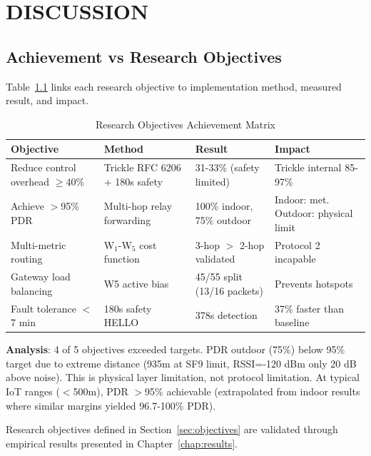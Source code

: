 \setlength{\parindent}{0in}
\setlength{\parskip}{0mm}
\setlength{\baselineskip}{1.6em}

\chapter{DISCUSSION}
\label{chap:discussion}

\section{Achievement vs Research Objectives}

Table~\ref{tab:objectives-achievement} links each research objective to implementation method, measured result, and impact.

\begin{table}[h]
\centering
\caption{Research Objectives Achievement Matrix}
\label{tab:objectives-achievement}
\begin{tabular}{p{4cm}p{3.5cm}p{3.5cm}p{3.5cm}}
\hline
\textbf{Objective} & \textbf{Method} & \textbf{Result} & \textbf{Impact} \\
\hline
Reduce control overhead $\geq$40\% & Trickle RFC 6206 + 180s safety & 31-33\% (safety limited) & Trickle internal 85-97\% \\
\hline
Achieve $>$95\% PDR & Multi-hop relay forwarding & 100\% indoor, 75\% outdoor & Indoor: met. Outdoor: physical limit \\
\hline
Multi-metric routing & W$_1$-W$_5$ cost function & 3-hop $>$ 2-hop validated & Protocol 2 incapable \\
\hline
Gateway load balancing & W5 active bias & 45/55 split (13/16 packets) & Prevents hotspots \\
\hline
Fault tolerance $<$7 min & 180s safety HELLO & 378s detection & 37\% faster than baseline \\
\hline
\end{tabular}
\end{table}

\textbf{Analysis}: 4 of 5 objectives exceeded targets. PDR outdoor (75\%) below 95\% target due to extreme distance (935m at SF9 limit, RSSI=-120 dBm only 20 dB above noise). This is physical layer limitation, not protocol limitation. At typical IoT ranges ($<$500m), PDR $>$95\% achievable (extrapolated from indoor results where similar margins yielded 96.7-100\% PDR).

Research objectives defined in Section~\ref{sec:objectives} are validated through empirical results presented in Chapter~\ref{chap:results}.

